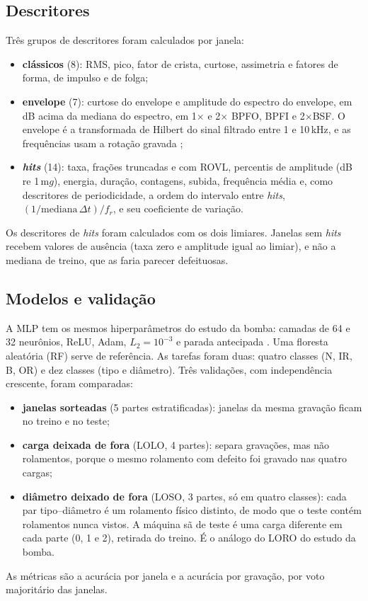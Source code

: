 \documentclass[12pt]{article}
\begin{document}
\subsection{Descritores}

Três grupos de descritores foram calculados por janela:
\begin{itemize}
	\item \textbf{clássicos} (8): RMS, pico, fator de crista, curtose, assimetria e fatores de forma, de impulso e de folga;
	\item \textbf{envelope} (7): curtose do envelope e amplitude do espectro do envelope, em dB acima da mediana do espectro, em 1\(\times\) e 2\(\times\) BPFO, BPFI e 2\(\times\)BSF. O envelope é a transformada de Hilbert do sinal filtrado entre 1 e 10\,kHz, e as frequências usam a rotação gravada \cite{randall2011};
	\item \textbf{\textit{hits}} (14): taxa, frações truncadas e com ROVL, percentis de amplitude (dB re 1\,m\(g\)), energia, duração, contagens, subida, frequência média e, como descritores de periodicidade, a ordem do intervalo entre \textit{hits}, \((1/\mathrm{mediana}\,\Delta t)/f_r\), e seu coeficiente de variação.
\end{itemize}
Os descritores de \textit{hits} foram calculados com os dois limiares. Janelas sem \textit{hits} recebem valores de ausência (taxa zero e amplitude igual ao limiar), e não a mediana de treino, que as faria parecer defeituosas.

\subsection{Modelos e validação}

A MLP tem os mesmos hiperparâmetros do estudo da bomba: camadas de 64 e 32 neurônios, ReLU, Adam, \(L_2 = 10^{-3}\) e parada antecipada \cite{pedregosa2011}. Uma floresta aleatória (RF) serve de referência. As tarefas foram duas: quatro classes (N, IR, B, OR) e dez classes (tipo e diâmetro). Três validações, com independência crescente, foram comparadas:
\begin{itemize}
	\item \textbf{janelas sorteadas} (5 partes estratificadas): janelas da mesma gravação ficam no treino e no teste;
	\item \textbf{carga deixada de fora} (LOLO, 4 partes): separa gravações, mas não rolamentos, porque o mesmo rolamento com defeito foi gravado nas quatro cargas;
	\item \textbf{diâmetro deixado de fora} (LOSO, 3 partes, só em quatro classes): cada par tipo--diâmetro é um rolamento físico distinto, de modo que o teste contém rolamentos nunca vistos. A máquina sã de teste é uma carga diferente em cada parte (0, 1 e 2), retirada do treino. É o análogo do LORO do estudo da bomba.
\end{itemize}
As métricas são a acurácia por janela e a acurácia por gravação, por voto majoritário das janelas.
\end{document}
